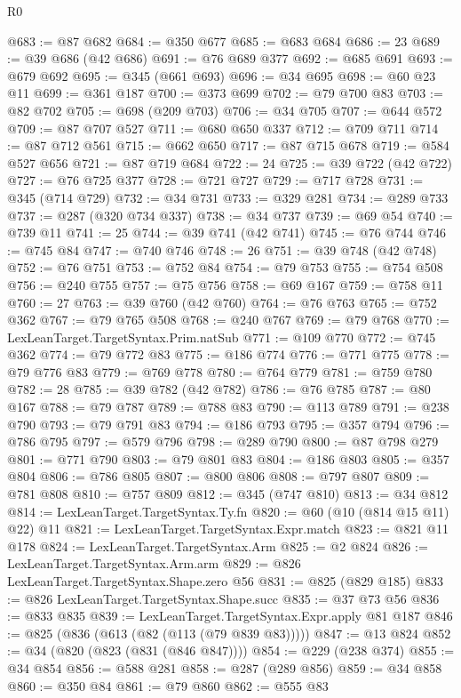 \begin{lexlean}{R0}
\begin{coremodule}
@683 := @87 @682
@684 := @350 @677
@685 := @683 @684
@686 := 23
@689 := @39 @686 (@42 @686)
@691 := @76 @689 @377
@692 := @685 @691
@693 := @679 @692
@695 := @345 (@661 @693)
@696 := @34 @695
@698 := @60 @23 @11
@699 := @361 @187
@700 := @373 @699
@702 := @79 @700 @83
@703 := @82 @702
@705 := @698 (@209 @703)
@706 := @34 @705
@707 := @644 @572
@709 := @87 @707 @527
@711 := @680 @650 @337
@712 := @709 @711
@714 := @87 @712 @561
@715 := @662 @650
@717 := @87 @715 @678
@719 := @584 @527 @656
@721 := @87 @719 @684
@722 := 24
@725 := @39 @722 (@42 @722)
@727 := @76 @725 @377
@728 := @721 @727
@729 := @717 @728
@731 := @345 (@714 @729)
@732 := @34 @731
@733 := @329 @281
@734 := @289 @733
@737 := @287 (@320 @734 @337)
@738 := @34 @737
@739 := @69 @54
@740 := @739 @11
@741 := 25
@744 := @39 @741 (@42 @741)
@745 := @76 @744
@746 := @745 @84
@747 := @740 @746
@748 := 26
@751 := @39 @748 (@42 @748)
@752 := @76 @751
@753 := @752 @84
@754 := @79 @753
@755 := @754 @508
@756 := @240 @755
@757 := @75 @756
@758 := @69 @167
@759 := @758 @11
@760 := 27
@763 := @39 @760 (@42 @760)
@764 := @76 @763
@765 := @752 @362
@767 := @79 @765 @508
@768 := @240 @767
@769 := @79 @768
@770 := LexLeanTarget.TargetSyntax.Prim.natSub
@771 := @109 @770
@772 := @745 @362
@774 := @79 @772 @83
@775 := @186 @774
@776 := @771 @775
@778 := @79 @776 @83
@779 := @769 @778
@780 := @764 @779
@781 := @759 @780
@782 := 28
@785 := @39 @782 (@42 @782)
@786 := @76 @785
@787 := @80 @167
@788 := @79 @787
@789 := @788 @83
@790 := @113 @789
@791 := @238 @790
@793 := @79 @791 @83
@794 := @186 @793
@795 := @357 @794
@796 := @786 @795
@797 := @579 @796
@798 := @289 @790
@800 := @87 @798 @279
@801 := @771 @790
@803 := @79 @801 @83
@804 := @186 @803
@805 := @357 @804
@806 := @786 @805
@807 := @800 @806
@808 := @797 @807
@809 := @781 @808
@810 := @757 @809
@812 := @345 (@747 @810)
@813 := @34 @812
@814 := LexLeanTarget.TargetSyntax.Ty.fn
@820 := @60 (@10 (@814 @15 @11) @22) @11
@821 := LexLeanTarget.TargetSyntax.Expr.match
@823 := @821 @11 @178
@824 := LexLeanTarget.TargetSyntax.Arm
@825 := @2 @824
@826 := LexLeanTarget.TargetSyntax.Arm.arm
@829 := @826 LexLeanTarget.TargetSyntax.Shape.zero @56
@831 := @825 (@829 @185)
@833 := @826 LexLeanTarget.TargetSyntax.Shape.succ
@835 := @37 @73 @56
@836 := @833 @835
@839 := LexLeanTarget.TargetSyntax.Expr.apply @81 @187
@846 := @825 (@836 (@613 (@82 (@113 (@79 @839 @83)))))
@847 := @13 @824
@852 := @34 (@820 (@823 (@831 (@846 @847))))
@854 := @229 (@238 @374)
@855 := @34 @854
@856 := @588 @281
@858 := @287 (@289 @856)
@859 := @34 @858
@860 := @350 @84
@861 := @79 @860
@862 := @555 @83

\end{coremodule}
\end{lexlean}
